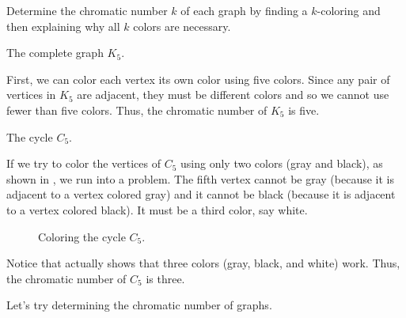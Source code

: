\begin{exam}
\label{exam_chromatic_K5_C5}
    Determine the chromatic number $k$ of each graph by finding a $k$-coloring and then explaining why all $k$ colors are necessary.
        \begin{apart}
            \item The complete graph $K_5$.
                \begin{soln}
                    First, we can color each vertex its own color using five colors.  Since any pair of vertices in $K_5$ are adjacent, they must be different colors and so we cannot use fewer than five colors.  Thus, the chromatic number of $K_5$ is five.
                \end{soln}
                
            \item  The cycle $C_5$.
                \begin{soln}
                    If we try to color the vertices of $C_5$ using only two colors (gray and black), as shown in , we run into a problem.  The fifth vertex cannot be gray (because it is adjacent to a vertex colored gray) and it cannot be black (because it is adjacent to a vertex colored black).  It must be a third color, say white.

                        \begin{figure}[hbtp]
                            \centering
                            
                            \caption{Coloring the cycle $C_5$.}
                            \label{fig_C5_3colored}
                        \end{figure}
                    
                    Notice that  actually shows that three colors (gray, black, and white) work.  Thus, the chromatic number of $C_5$ is three.
                \end{soln}
        \end{apart}
\end{exam}

Let's try determining the chromatic number of graphs.

